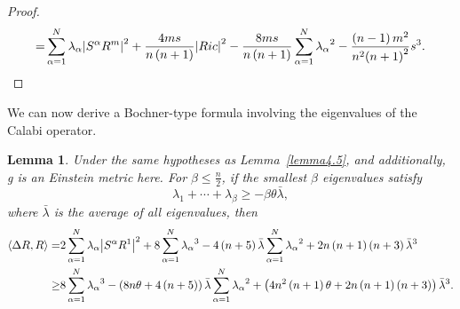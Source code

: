 \documentclass{amsart}
\newtheorem{lemma}[theorem]{Lemma}
\theoremstyle{definition}
\theoremstyle{remark}
\numberwithin{equation}{section}
\begin{document}
\begin{proof}
\begin{align*}
   =& \sum\limits_{\alpha  = 1}^N {{\lambda _\alpha }{{\left| {{S^\alpha }{R^m}} \right|}^2}}  + \frac{{4ms}}{{n\left( {n + 1} \right)}}{\left| {Ric} \right|^2} - \frac{{8ms}}{{n\left( {n + 1} \right)}}\sum\limits_{\alpha  = 1}^N {{\lambda _\alpha }^2}  - \frac{{\left( {n - 1} \right){m^2}}}{{{n^2}{{\left( {n + 1} \right)}^2}}}{s^3}. \hfill \\
\end{align*}
\end{proof}
We can now derive a Bochner-type formula involving the eigenvalues of the Calabi operator.
\begin{lemma}
Under the same hypotheses as Lemma~\ref{lemma4.5}, and additionally, g is an Einstein metric here. For $\beta \le \frac{n}{2}$, if the smallest $\beta$ eigenvalues satisfy $${\lambda _1} +  \cdots  + {\lambda _\beta} \ge  - \beta\theta \bar \lambda, $$ where $\bar \lambda$ is  the average of all eigenvalues, then
\begin{equation}
\label{equation4.1}
\begin{aligned}
  \left\langle {\Delta R,R} \right\rangle  =& 2\sum\limits_{\alpha  = 1}^N {{\lambda _\alpha }{{\left| {{S^\alpha }{R^1}} \right|}^2}}  + 8\sum\limits_{\alpha  = 1}^N {{\lambda _\alpha }^3}  - 4\left( {n + 5} \right)\bar \lambda \sum\limits_{\alpha  = 1}^N {{\lambda _\alpha }^2}  + 2n\left( {n + 1} \right)\left( {n + 3} \right){{\bar \lambda }^3} \hfill \\
   \ge& 8\sum\limits_{\alpha  = 1}^N {{\lambda _\alpha }^3}  - \left( {8n\theta  + 4\left( {n + 5} \right)} \right)\bar \lambda \sum\limits_{\alpha  = 1}^N {{\lambda _\alpha }^2}  + \left( {4{n^2}\left( {n + 1} \right)\theta  + 2n\left( {n + 1} \right)\left( {n + 3} \right)} \right){{\bar \lambda }^3} .
\end{aligned}
\end{equation}
\end{lemma}
\end{document}

